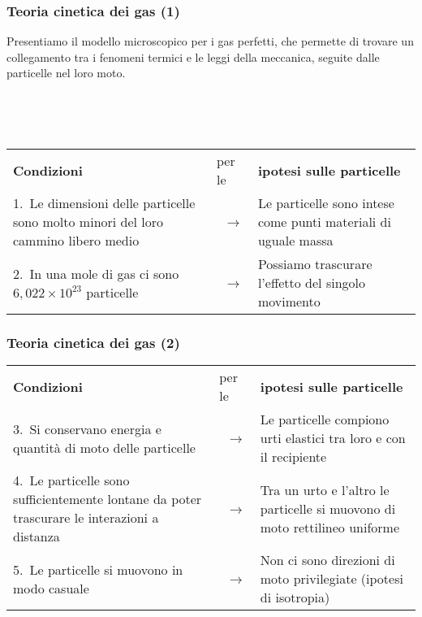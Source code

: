 \documentclass[]{beamer}
\theoremstyle{plain}
\begin{document}
\begin{frame}
\frametitle{Teoria cinetica dei gas (1)}
Presentiamo il modello microscopico per i gas perfetti, che permette di trovare un \alert{collegamento tra i fenomeni termici e le leggi della meccanica}, seguite dalle particelle nel loro moto.\pause

~

~

\centering
\begin{tabular}{p{}p{}p{}}
\textbf{Condizioni} & per le & \textbf{ipotesi sulle particelle} \\\rule{0pt}{5ex}\pause
\hspace*{-1.4mm}1.~Le dimensioni delle particelle sono molto minori del loro cammino libero medio & ~$ \longrightarrow  $ & Le particelle sono intese come punti materiali di uguale massa \\\rule{0pt}{5ex}\pause
\hspace*{-1.4mm}2.~In una mole di gas ci sono $ 6,022 \times 10^{23} $ particelle & ~$ \longrightarrow  $ & Possiamo trascurare l'effetto del singolo movimento\\
\end{tabular}
\end{frame}


\begin{frame}
\frametitle{Teoria cinetica dei gas (2)}
\centering
\begin{tabular}{p{}p{}p{}}
\textbf{Condizioni} & per le & \textbf{ipotesi sulle particelle} \\\rule{0pt}{5ex}
\hspace*{-4mm}3.~Si conservano energia e quantità di moto delle particelle & ~$ \longrightarrow  $ & Le particelle compiono urti elastici tra loro e con il recipiente \\\rule{0pt}{5ex}\pause
\hspace*{-1.4mm}4.~Le particelle sono sufficientemente lontane da poter trascurare le interazioni a distanza & ~$ \longrightarrow  $ & Tra un urto e l'altro le particelle si muovono di moto rettilineo uniforme \\\rule{0pt}{5ex}\pause
\hspace*{-1.4mm}5.~Le particelle si muovono in modo casuale & ~$ \longrightarrow  $ & Non ci sono direzioni di moto privilegiate (ipotesi di \alert{isotropia}) \\
\end{tabular}
\end{frame}
\end{document}
